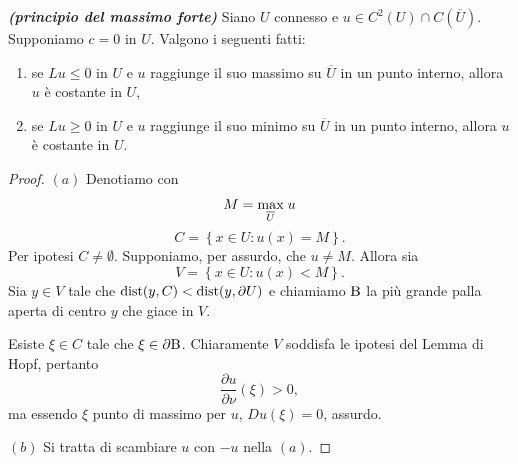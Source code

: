 \begin{teorema}\textbf{\emph{(principio del massimo forte)}}
	Siano $U$ connesso e $u \in C^2(U)\cap C(\overline{U}) $. Supponiamo $c= 0$ in $U$. Valgono i seguenti fatti:
	\begin{enumerate}[$(a)$]
		\item se $Lu \le 0$ in $U$ e $u$ raggiunge il suo massimo su $\overline{U}$ in un punto interno, allora $u$ è costante in $U$,
		\item se $Lu \ge 0$ in $U$ e $u$ raggiunge il suo minimo su $\overline{U}$ in un punto interno, allora $u$ è costante in $U$.
	\end{enumerate}
\end{teorema}
\begin{proof}\hfill
	\par\noindent
	$(a)$ Denotiamo con 
	\[ M = \underset{\overline{U}}{\textup{max}}\; u \]
	\[ C = \left\lbrace x \in U : u(x) = M\right\rbrace. \]
	Per ipotesi $C \ne \emptyset$. Supponiamo, per assurdo, che $u \ne M$. Allora sia 
	\[ V = \left\lbrace x \in U : u(x)< M\right\rbrace.\]
	Sia $y \in V$ tale che $\textup{dist}(y,C) < \textup{dist}(y,\partial U)$ e chiamiamo $\textup{B}$ la più grande palla aperta di centro $y$ che giace in $V$. 
	
	Esiste $\xi \in C$ tale che $\xi \in \partial \textup{B}$. Chiaramente $V$ soddisfa le ipotesi del Lemma di Hopf, pertanto
	\[ \frac{\partial u}{\partial \nu}(\xi) >0, \]
	ma essendo $\xi$ punto di massimo per $u$, $Du(\xi) = 0$, assurdo.
	\par\noindent
	$(b)$ Si tratta di scambiare $u$ con $-u$ nella $(a)$.
\end{proof}

